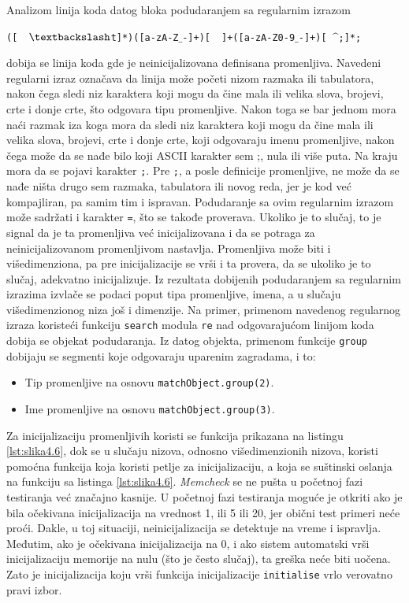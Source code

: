\documentclass[12pt,oneside]{memoir}
\theoremstyle{plain}
\theoremstyle{definition}
\begin{document}
Analizom linija koda datog bloka podudaranjem sa regularnim izrazom 
\begin{center}
\texttt{([$\quad \textbackslash$t]*)([a-zA-Z$\_$-]+)[$\quad $]+([a-zA-Z0-9$\_$-]+)[ $\^$;]*;}
\end{center}
dobija se linija koda gde je neinicijalizovana definisana promenljiva. Navedeni regularni izraz označava da linija može početi nizom razmaka ili tabulatora, nakon čega sledi niz karaktera koji mogu da čine mala ili velika slova, brojevi, crte i donje crte, što odgovara tipu promenljive. Nakon toga se bar jednom mora naći razmak iza koga mora da sledi niz karaktera koji mogu da čine mala ili velika slova, brojevi, crte i donje crte, koji odgovaraju imenu promenljive, nakon čega može da se nađe bilo koji ASCII karakter sem ;, nula ili više puta. Na kraju mora da se pojavi karakter \texttt{;}. Pre \texttt{;}, a posle definicije promenljive, ne može da se nađe ništa drugo sem razmaka, tabulatora ili novog reda, jer je kod već kompajliran, pa samim tim i ispravan. Podudaranje sa ovim regularnim izrazom može sadržati i karakter \texttt{=}, što se takođe proverava. Ukoliko je to slučaj, to je signal da je ta promenljiva već inicijalizovana i da se potraga za neinicijalizovanom promenljivom nastavlja. Promenljiva može biti i višedimenziona, pa pre inicijalizacije se vrši i ta provera, da se ukoliko je to slučaj, adekvatno inicijalizuje. Iz rezultata dobijenih podudaranjem sa regularnim izrazima izvlače se podaci poput tipa promenljive, imena, a u slučaju višedimenzionog niza još i dimenzije. Na primer, primenom navedenog regularnog izraza koristeći funkciju \texttt{search} modula \texttt{re} nad odgovarajućom linijom koda dobija se objekat podudaranja. Iz datog objekta, primenom funkcije \texttt{group} dobijaju se segmenti koje odgovaraju uparenim zagradama, i to:
\begin{itemize}
\item Tip promenljive na osnovu \texttt{matchObject.group(2)}.
\item Ime promenljive na osnovu \texttt{matchObject.group(3)}.
\end{itemize} 
Za inicijalizaciju promenljivih koristi se funkcija prikazana na listingu \ref{lst:slika4.6}, dok se u slučaju nizova, odnosno višedimenzionih nizova, koristi pomoćna funkcija koja koristi petlje za inicijalizaciju, a koja se suštinski oslanja na funkciju sa listinga \ref{lst:slika4.6}. \textit{Memcheck} se ne pušta u početnoj fazi testiranja već značajno kasnije. U početnoj fazi testiranja moguće je otkriti ako je bila očekivana inicijalizacija na vrednost 1, ili 5 ili 20, jer obični test primeri neće proći. Dakle, u toj situaciji, neinicijalizacija se detektuje na vreme i ispravlja. Međutim, ako je očekivana inicijalizacija na 0, i ako sistem automatski vrši inicijalizaciju memorije na nulu (što je često slučaj), ta greška neće biti uočena. Zato je inicijalizacija koju vrši funkcija inicijalizacije \texttt{initialise} vrlo verovatno pravi izbor.
\end{document}
